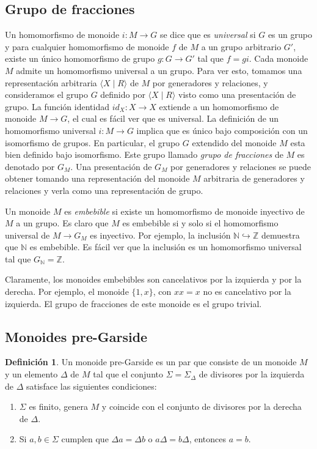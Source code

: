 \documentclass[12pt]{book}
\theoremstyle{definition}
\newtheorem{defi}{Definición}[section]
\begin{document}
\subsection{Grupo de fracciones}

Un homomorfismo de monoide $i:M\rightarrow G$ se dice que es \textit{universal} si $G$ es un grupo y para cualquier homomorfismo de monoide $f$ de $M$ a un grupo arbitrario $G'$, existe un único homomorfismo de grupo $g:G\rightarrow G'$ tal que $f=gi$. Cada monoide $M$ admite un homomorfismo universal a un grupo. Para ver esto, tomamos una representación arbitraria $\langle X \mid R \rangle$ de $M$ por generadores y relaciones, y consideramos el grupo $G$ definido por $\langle X \mid R \rangle$ visto como una presentación de grupo. La función identidad $id_X:X\rightarrow X$ extiende a un homomorfismo de monoide $M\rightarrow G$, el cual es fácil ver que es universal. La definición de un homomorfismo universal $i:M\rightarrow G$ implica que es único bajo composición con un isomorfismo de grupos. En particular, el grupo $G$ extendido del monoide $M$ esta bien definido bajo isomorfismo. Este grupo llamado \textit{grupo de fracciones} de $M$ es denotado por $G_M$. Una presentación de $G_M$ por generadores y relaciones se puede obtener tomando una representación del monoide $M$ arbitraria de generadores y relaciones y verla como una representación de grupo.

Un monoide $M$ es \textit{embebible} si existe un homomorfismo de monoide inyectivo de $M$ a un grupo. Es claro que $M$ es embebible si y solo si el homomorfismo universal de $M\rightarrow G_M$ es inyectivo. Por ejemplo, la inclusión $\mathbb{N}\hookrightarrow\mathbb{Z}$ demuestra que $\mathbb{N}$ es embebible. Es fácil ver que la inclusión es un homomorfismo universal tal que $G_\mathbb{N}=\mathbb{Z}$.

Claramente, los monoides embebibles son cancelativos por la izquierda y por la derecha. Por ejemplo, el monoide $\{1,x\}$, con $xx=x$ no es cancelativo por la izquierda. El grupo de fracciones de este monoide es el grupo trivial.

\subsection{Monoides pre-Garside}

\begin{defi}
Un monoide pre-Garside es un par que consiste de un monoide $M$ y un elemento $\Delta$ de $M$ tal que el conjunto $\Sigma=\Sigma_\Delta$ de divisores por la izquierda de $\Delta$ satisface las siguientes condiciones:

\begin{enumerate}
\item $\Sigma$ es finito, genera $M$ y  coincide con el conjunto de divisores por la derecha de $\Delta$.
\item Si $a,b\in\Sigma$ cumplen que $\Delta a=\Delta b$ o $a\Delta=b\Delta$, entonces $a=b$.
\end{enumerate}
\label{defi:pre-garside}
\end{defi}
\end{document}
